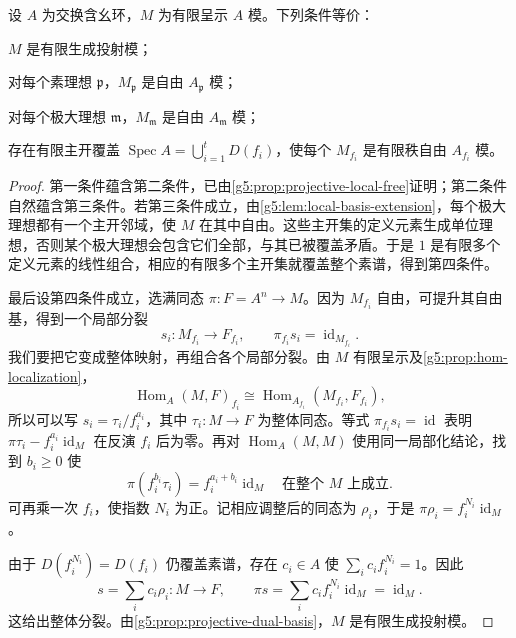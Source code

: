 \begin{theorem}
\label{g5:thm:finite-projective-local}
	设 \(A\) 为交换含幺环，\(M\) 为有限呈示 \(A\) 模。下列条件等价：
	\begin{equivalences}
		\item \(M\) 是有限生成投射模；
		\item 对每个素理想 \(\mathfrak p\)，\(M_{\mathfrak p}\) 是自由 \(A_{\mathfrak p}\) 模；
		\item 对每个极大理想 \(\mathfrak m\)，\(M_{\mathfrak m}\) 是自由 \(A_{\mathfrak m}\) 模；
		\item 存在有限主开覆盖 \(\operatorname{Spec}A=\bigcup_{i=1}^tD(f_i)\)，使每个 \(M_{f_i}\) 是有限秩自由 \(A_{f_i}\) 模。
	\end{equivalences}
\end{theorem}
\begin{proof}
	第一条件蕴含第二条件，已由\cref{g5:prop:projective-local-free}证明；第二条件自然蕴含第三条件。若第三条件成立，由\cref{g5:lem:local-basis-extension}，每个极大理想都有一个主开邻域，使 \(M\) 在其中自由。这些主开集的定义元素生成单位理想，否则某个极大理想会包含它们全部，与其已被覆盖矛盾。于是 \(1\) 是有限多个定义元素的线性组合，相应的有限多个主开集就覆盖整个素谱，得到第四条件。

	最后设第四条件成立，选满同态 \(\pi:F=A^n\rightarrow M\)。因为 \(M_{f_i}\) 自由，可提升其自由基，得到一个局部分裂
	\[
		s_i:M_{f_i}\longrightarrow F_{f_i},\qquad
		\pi_{f_i}s_i=\operatorname{id}_{M_{f_i}}.
	\]
	我们要把它变成整体映射，再组合各个局部分裂。由 \(M\) 有限呈示及\cref{g5:prop:hom-localization}，
	\[
		\operatorname{Hom}_A(M,F)_{f_i}
		\cong\operatorname{Hom}_{A_{f_i}}(M_{f_i},F_{f_i}),
	\]
	所以可以写 \(s_i=\tau_i/f_i^{a_i}\)，其中 \(\tau_i:M\rightarrow F\) 为整体同态。等式 \(\pi_{f_i}s_i=\operatorname{id}\) 表明
	\(\pi\tau_i-f_i^{a_i}\operatorname{id}_M\) 在反演 \(f_i\) 后为零。再对 \(\operatorname{Hom}_A(M,M)\) 使用同一局部化结论，找到 \(b_i\geq0\) 使
	\[
		\pi(f_i^{b_i}\tau_i)=f_i^{a_i+b_i}\operatorname{id}_M
		\quad\text{在整个 }M\text{ 上成立}.
	\]
	可再乘一次 \(f_i\)，使指数 \(N_i\) 为正。记相应调整后的同态为 \(\rho_i\)，于是 \(\pi\rho_i=f_i^{N_i}\operatorname{id}_M\)。

	由于 \(D(f_i^{N_i})=D(f_i)\) 仍覆盖素谱，存在 \(c_i\in A\) 使 \(\sum_i c_i f_i^{N_i}=1\)。因此
	\[
		s=\sum_i c_i\rho_i:M\longrightarrow F,\qquad
		\pi s=\sum_i c_i f_i^{N_i}\operatorname{id}_M=\operatorname{id}_M.
	\]
	这给出整体分裂。由\cref{g5:prop:projective-dual-basis}，\(M\) 是有限生成投射模。
\end{proof}

